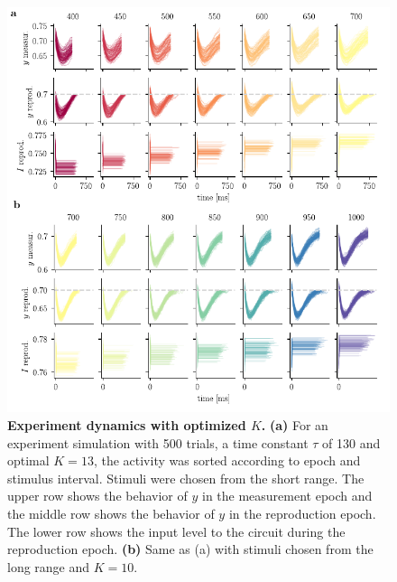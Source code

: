 \documentclass[10pt, a4paper]{article}
\begin{document}
\begin{figure}[!htb]
	\centering
	\includegraphics{figures/supp_experiment.pdf}
	\caption{\textbf{Experiment dynamics with optimized $K$.}
	\textbf{(a)} For an experiment simulation with 500 trials, a time constant $\tau$ of 130 and optimal $K = 13$, the activity was sorted according to epoch and stimulus interval. Stimuli were chosen from the short range. The upper row shows the behavior of $y$ in the measurement epoch and the middle row shows the behavior of $y$ in the reproduction epoch. The lower row shows the input level to the circuit during the reproduction epoch. 
	\textbf{(b)} Same as (a) with stimuli chosen from the long range and $K = 10$. 
	}
\label{sup:experiment}
\end{figure}
\end{document}
